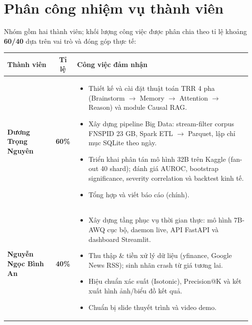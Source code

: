 \documentclass[11pt, a4paper]{article}
\begin{document}

\section*{Phân công nhiệm vụ thành viên}
Nhóm gồm hai thành viên; khối lượng công việc được phân chia theo tỉ lệ khoảng \textbf{60/40} dựa trên vai trò và đóng góp thực tế:

\begin{table}[H]
    \centering
    \renewcommand{\arraystretch}{1.3}
    \begin{tabularx}{\textwidth}{@{} >{\raggedright\arraybackslash}p{3.5cm} c X @{}}
    \toprule
    \textbf{Thành viên} & \textbf{Tỉ lệ} & \textbf{Công việc đảm nhận} \\
    \midrule
    \textbf{Dương Trọng Nguyên} & \textbf{60\%} &
    \begin{itemize}[leftmargin=1.2em, nosep]
        \item Thiết kế và cài đặt thuật toán TRR 4 pha (Brainstorm $\rightarrow$ Memory $\rightarrow$ Attention $\rightarrow$ Reason) và module Causal RAG.
        \item Xây dựng pipeline Big Data: stream-filter corpus FNSPID 23 GB, Spark ETL $\rightarrow$ Parquet, lập chỉ mục SQLite theo ngày.
        \item Triển khai phân tán mô hình 32B trên Kaggle (fan-out 40 shard); đánh giá AUROC, bootstrap significance, severity correlation và backtest kinh tế.
        \item Tổng hợp và viết báo cáo (chính).
    \end{itemize} \\
    \midrule
    \textbf{Nguyễn Ngọc Bình An} & \textbf{40\%} &
    \begin{itemize}[leftmargin=1.2em, nosep]
        \item Xây dựng tầng phục vụ thời gian thực: mô hình 7B-AWQ cục bộ, daemon live, API FastAPI và dashboard Streamlit.
        \item Thu thập \& tiền xử lý dữ liệu (yfinance, Google News RSS); sinh nhãn crash từ giá tương lai.
        \item Hiệu chuẩn xác suất (Isotonic), Precision@K và kết xuất hình ảnh/biểu đồ kết quả.
        \item Chuẩn bị slide thuyết trình và video demo.
    \end{itemize} \\
    \bottomrule
    \end{tabularx}
\end{table}
\end{document}
